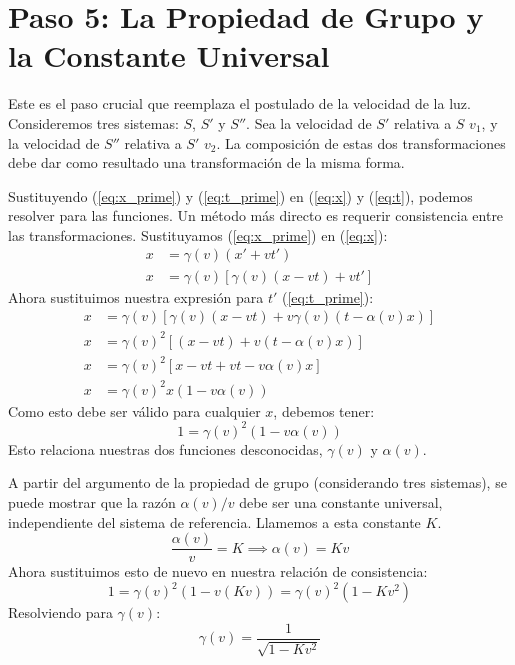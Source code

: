 \documentclass[11pt,a4paper]{book}
\begin{document}
\section{Paso 5: La Propiedad de Grupo y la Constante Universal}
Este es el paso crucial que reemplaza el postulado de la velocidad de la luz. Consideremos tres sistemas: $S$, $S'$ y $S''$. Sea la velocidad de $S'$ relativa a $S$ $v_1$, y la velocidad de $S''$ relativa a $S'$ $v_2$. La composición de estas dos transformaciones debe dar como resultado una transformación de la misma forma.

Sustituyendo (\ref{eq:x_prime}) y (\ref{eq:t_prime}) en (\ref{eq:x}) y (\ref{eq:t}), podemos resolver para las funciones. Un método más directo es requerir consistencia entre las transformaciones. Sustituyamos (\ref{eq:x_prime}) en (\ref{eq:x}):
\begin{align*}
x &= \gamma(v)(x' + vt') \\
x &= \gamma(v)[\gamma(v)(x-vt) + v t']
\end{align*}
Ahora sustituimos nuestra expresión para $t'$ (\ref{eq:t_prime}):
\begin{align*}
x &= \gamma(v)[\gamma(v)(x-vt) + v \gamma(v)(t - \alpha(v)x)] \\
x &= \gamma(v)^2 [ (x-vt) + v(t-\alpha(v)x) ] \\
x &= \gamma(v)^2 [ x - vt + vt - v\alpha(v)x ] \\
x &= \gamma(v)^2 x (1 - v\alpha(v))
\end{align*}
Como esto debe ser válido para cualquier $x$, debemos tener:
\[ 1 = \gamma(v)^2 (1 - v\alpha(v)) \]
Esto relaciona nuestras dos funciones desconocidas, $\gamma(v)$ y $\alpha(v)$.

A partir del argumento de la propiedad de grupo (considerando tres sistemas), se puede mostrar que la razón $\alpha(v)/v$ debe ser una constante universal, independiente del sistema de referencia. Llamemos a esta constante $K$.
\[ \frac{\alpha(v)}{v} = K \implies \alpha(v) = Kv \]
Ahora sustituimos esto de nuevo en nuestra relación de consistencia:
\[ 1 = \gamma(v)^2 (1 - v(Kv)) = \gamma(v)^2 (1 - K v^2) \]
Resolviendo para $\gamma(v)$:
\[ \boxed{\gamma(v) = \frac{1}{\sqrt{1 - K v^2}}} \]
\end{document}
